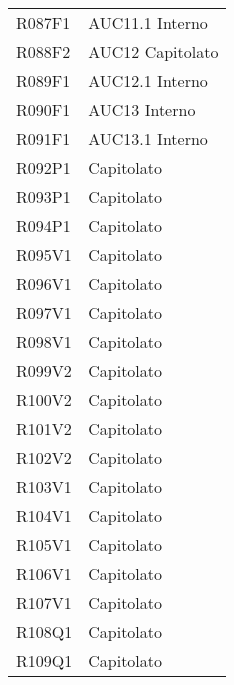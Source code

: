 \documentclass[../analisi-dei-requisiti.tex]{subfiles}
\begin{document}
\begin{longtable}[H]{ p{4cm} | p{4cm} }
  R087F1                               & AUC11.1 Interno               \\
  R088F2                               & AUC12 Capitolato              \\
  R089F1                               & AUC12.1 Interno               \\
  R090F1                               & AUC13 Interno                 \\
  R091F1                               & AUC13.1 Interno               \\
  R092P1                               & Capitolato                    \\
  R093P1                               & Capitolato                    \\
  R094P1                               & Capitolato                    \\
  R095V1                               & Capitolato                    \\
  R096V1                               & Capitolato                    \\
  R097V1                               & Capitolato                    \\
  R098V1                               & Capitolato                    \\
  R099V2                               & Capitolato                    \\
  R100V2                               & Capitolato                    \\
  R101V2                               & Capitolato                    \\
  R102V2                               & Capitolato                    \\
  R103V1                               & Capitolato                    \\
  R104V1                               & Capitolato                    \\
  R105V1                               & Capitolato                    \\
  R106V1                               & Capitolato                    \\
  R107V1                               & Capitolato                    \\
  R108Q1                               & Capitolato                    \\
  R109Q1                               & Capitolato                    \\

\end{longtable}
\end{document}
